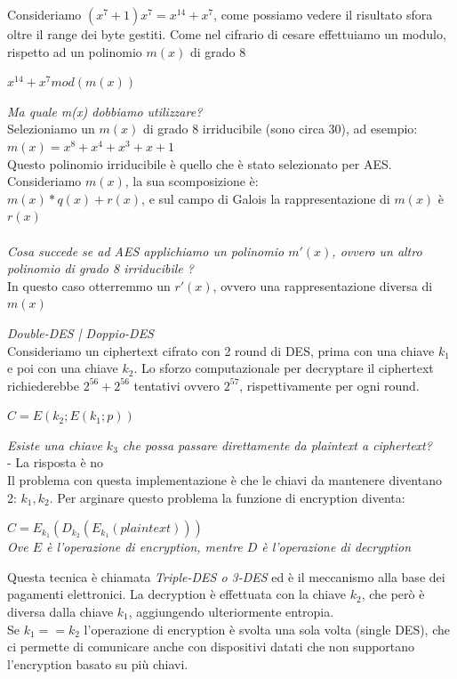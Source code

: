\documentclass[11pt, oneside]{article}   	%
\begin{document}
\begin{itemize}
Consideriamo $(x^7+1)x^7 = x^{14} + x^7$, come possiamo vedere il risultato sfora oltre il range dei byte gestiti.
Come nel cifrario di cesare effettuiamo un modulo, rispetto ad un polinomio $m(x)$ di grado 8
\begin{center}
$x^{14} + x^7 mod(m(x))$
\end{center}
\emph{Ma quale m(x) dobbiamo utilizzare?} \\Selezioniamo un $m(x)$ di grado 8 irriducibile (sono circa 30), ad esempio: \\$m(x) = x^8 + x^4 + x^3 +x+1$\\
Questo polinomio irriducibile è quello che è stato selezionato per AES.\\
Consideriamo $m(x)$, la sua scomposizione è: \\$m(x) * q(x) + r(x)$, e sul campo di Galois la rappresentazione di $m(x)$ è $r(x)$ \\\\
\emph{Cosa succede se ad AES applichiamo un polinomio $m'(x)$, ovvero un altro polinomio di grado 8 irriducibile ?}\\
In questo caso otterremmo un $r'(x)$, ovvero una rappresentazione diversa di $m(x)$

\end{itemize}
\emph{Double-DES | Doppio-DES}\\
Consideriamo un ciphertext cifrato con 2 round di DES, prima con una chiave $k_1$ e poi con una chiave $k_2$. Lo sforzo computazionale per decryptare il ciphertext richiederebbe $2^{56} + 2^{56}$ tentativi ovvero $2^{57}$, rispettivamente per ogni round.
\begin{center}
$C= E(k_2;E(k_1;p))$
\end{center}
\emph{Esiste una chiave $k_3$ che possa passare direttamente da plaintext a ciphertext?}\\
 - La risposta è no\\
 Il problema con questa implementazione è che le chiavi da mantenere diventano 2: $k_1, k_2$. Per arginare questo problema la funzione di encryption diventa:
 \begin{center}
 $C = E_{k_1}(D_{k_2}(E_{k_1}(plaintext)))$\\
 \emph{Ove $E$ è l'operazione di encryption, mentre $D$ è l'operazione di decryption}
 \end{center}
 Questa tecnica è chiamata \emph{Triple-DES o 3-DES} ed è il meccanismo alla base dei pagamenti elettronici. La decryption è effettuata con la chiave $k_2$, che però è diversa dalla chiave $k_1$, aggiungendo ulteriormente entropia.\\Se $k_1 == k_2$ l'operazione di encryption è svolta una sola volta (single DES), che ci permette di comunicare anche con dispositivi datati che non supportano l'encryption basato su più chiavi.
 
\end{document}
